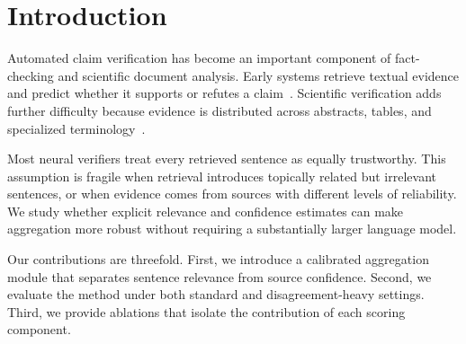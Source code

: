 \section{Introduction}

Automated claim verification has become an important component of fact-checking and
scientific document analysis. Early systems retrieve textual evidence and predict
whether it supports or refutes a claim~\cite{thorne2018fever}. Scientific verification
adds further difficulty because evidence is distributed across abstracts, tables, and
specialized terminology~\cite{wadden2020fact}.

Most neural verifiers treat every retrieved sentence as equally trustworthy. This
assumption is fragile when retrieval introduces topically related but irrelevant
sentences, or when evidence comes from sources with different levels of reliability.
We study whether explicit relevance and confidence estimates can make aggregation more
robust without requiring a substantially larger language model.

Our contributions are threefold. First, we introduce a calibrated aggregation module
that separates sentence relevance from source confidence. Second, we evaluate the
method under both standard and disagreement-heavy settings. Third, we provide ablations
that isolate the contribution of each scoring component.

